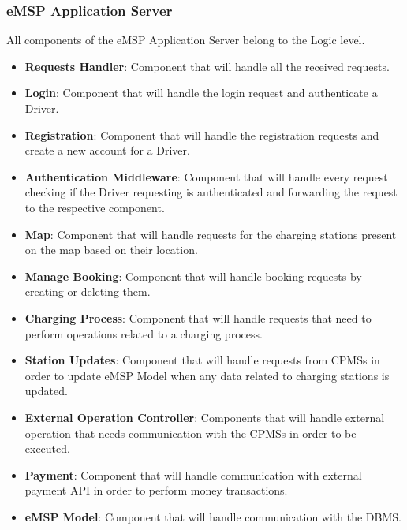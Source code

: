 \subsubsection{eMSP Application Server}
\label{emsPComponentView}
All components of the eMSP Application Server belong to the Logic level. 
\begin{itemize}
    \item \textbf{Requests Handler}: Component that will handle all the received requests.
    \item \textbf{Login}: Component that will handle the login request and authenticate a Driver.
    \item \textbf{Registration}: Component that will handle the registration requests and create a new account for a Driver.
    \item \textbf{Authentication Middleware}: Component that will handle every request checking if the Driver requesting is authenticated and forwarding the request to the respective component.
    \item \textbf{Map}: Component that will handle requests for the charging stations present on the map based on their location.
    \item \textbf{Manage Booking}: Component that will handle booking requests by creating or deleting them.
    \item \textbf{Charging Process}: Component that will handle requests that need to perform operations related to a charging process.
    \item \textbf{Station Updates}: Component that will handle requests from CPMSs in order to update eMSP Model when any data related to charging stations is updated.
    \item \textbf{External Operation Controller}: Components that will handle external operation that needs communication with the CPMSs in order to be executed.
    \item \textbf{Payment}: Component that will handle communication with external payment API in order to perform money transactions.
    \item \textbf{eMSP Model}: Component that will handle communication with the DBMS.
\end{itemize}
